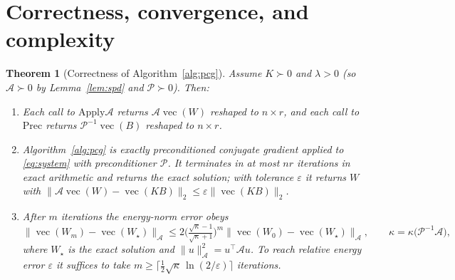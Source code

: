 \documentclass[12pt]{article}
\DeclareMathOperator{\vecop}{vec}
\newtheorem{theorem}{Theorem}
\begin{document}
\section{Correctness, convergence, and complexity}

\begin{theorem}[Correctness of Algorithm~\ref{alg:pcg}]\label{thm:pcg}
Assume $K\succ0$ and $\lambda>0$ (so $\mathcal A\succ0$ by Lemma~\ref{lem:spd}
and $\mathcal P\succ0$). Then:
\begin{enumerate}[label=(\alph*)]
\item Each call to $\mathrm{Apply}\mathcal A$ returns $\mathcal A\vecop(W)$
  reshaped to $n\times r$, and each call to $\mathrm{Prec}$ returns
  $\mathcal P^{-1}\vecop(B)$ reshaped to $n\times r$.
\item Algorithm~\ref{alg:pcg} is exactly preconditioned conjugate gradient
  applied to \eqref{eq:system} with preconditioner $\mathcal P$. It terminates in
  at most $nr$ iterations in exact arithmetic and returns the exact solution; with
  tolerance $\varepsilon$ it returns $W$ with $\|\mathcal A\vecop(W)-\vecop(KB)\|_2
  \le\varepsilon\|\vecop(KB)\|_2$.
\item After $m$ iterations the energy-norm error obeys
  \begin{equation}\label{eq:cgrate}
   \|\vecop(W_m)-\vecop(W_\star)\|_{\mathcal A}
   \le 2\Big(\tfrac{\sqrt{\kappa}-1}{\sqrt{\kappa}+1}\Big)^{\!m}
       \|\vecop(W_0)-\vecop(W_\star)\|_{\mathcal A},
   \qquad \kappa=\kappa\big(\mathcal P^{-1}\mathcal A\big),
  \end{equation}
  where $W_\star$ is the exact solution and $\|u\|_{\mathcal A}^2=u^{\!\top}\mathcal A u$.
  To reach relative energy error $\varepsilon$ it suffices to take
  $m\ge\big\lceil\tfrac12\sqrt{\kappa}\,\ln(2/\varepsilon)\big\rceil$ iterations.
\end{enumerate}
\end{theorem}
\end{document}
